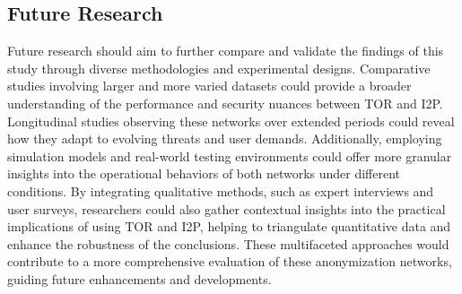 \documentclass[12pt,conference]{IEEEtran}
\begin{document}
\subsection{Future Research}
Future research should aim to further compare and validate the findings of this study through diverse methodologies and experimental designs. Comparative studies involving larger and more varied datasets could provide a broader understanding of the performance and security nuances between TOR and I2P. Longitudinal studies observing these networks over extended periods could reveal how they adapt to evolving threats and user demands. Additionally, employing simulation models and real-world testing environments could offer more granular insights into the operational behaviors of both networks under different conditions. By integrating qualitative methods, such as expert interviews and user surveys, researchers could also gather contextual insights into the practical implications of using TOR and I2P, helping to triangulate quantitative data and enhance the robustness of the conclusions. These multifaceted approaches would contribute to a more comprehensive evaluation of these anonymization networks, guiding future enhancements and developments.



\end{document}
